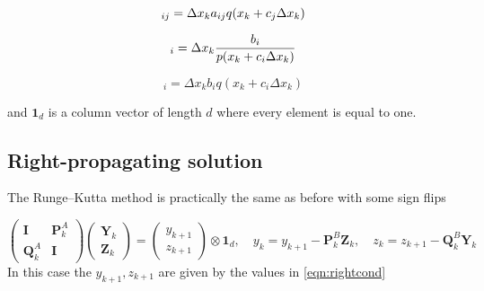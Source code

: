 \documentclass[a4paper,12pt]{article}
\begin{document}
\begin{equation}
[\mathbf{Q}_k^A]_{ij} = \Delta x_k a_{ij} q(x_k+c_j\Delta x_k) \\
\end{equation}

\begin{equation}
[\mathbf{P}_k^B]_{i}  = \Delta x_k\frac{b_{i}}{p(x_k+c_i\Delta x_k)} \\
\end{equation}

\begin{equation}
[\mathbf{Q}_k^B]_{i}  = \Delta x_k b_{i} q(x_k+c_i\Delta x_k) 
\end{equation}

and $\mathbf{1}_d$ is a column vector of length $d$ where every element is equal to one.

\subsection*{Right-propagating solution}
The Runge--Kutta method is practically the same as before with some sign flips

\begin{equation}
\begin{pmatrix}
\mathbf{I} & \mathbf{P}_k^A \\
\mathbf{Q}_k^A & \mathbf{I}
\end{pmatrix}
\begin{pmatrix}
\mathbf{Y}_k \\
\mathbf{Z}_k
\end{pmatrix}
= \begin{pmatrix}
y_{k+1} \\
z_{k+1}
\end{pmatrix}\otimes\mathbf{1}_d,\quad 
y_{k} = y_{k+1}-\mathbf{P}_k^B\mathbf{Z}_k,\quad
z_{k} = z_{k+1}-\mathbf{Q}_k^B\mathbf{Y}_k
\end{equation}
In this case the $y_{k+1},z_{k+1}$ are given by the values in \eqref{eqn:rightcond}
\end{document}
